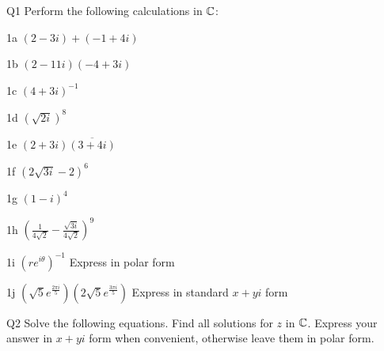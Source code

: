 \begin{question}{Q1}
Perform the following calculations in $\mathbb{C}$:
\end{question}

\begin{question}{1a}
$(2-3i)+(-1 +4i)$
\end{question}
\begin{question}{1b}
$(2-11i)(-4+3i)$
\end{question}
\begin{question}{1c}
$(4+3i)^{-1}$
\end{question}
\begin{question}{1d}
$(\sqrt{2i})^{8}$
\end{question}
\begin{question}{1e}
$(2+3i)\overline{(3+4i)}$
\end{question}
\begin{question}{1f}
$(2\sqrt{3i}-2)^{6}$
\end{question}
\begin{question}{1g}
$(1-i)^{4}$
\end{question}
\begin{question}{1h}
$(\frac{1}{4\sqrt{2}} - \frac{\sqrt{3i}}{4\sqrt{2}})^{9}$
\end{question}
\begin{question}{1i}
$(re^{i\theta})^{-1}$ Express in polar form
\end{question}
\begin{question}{1j}
$(\sqrt{5}e^{\frac{2\pi i}{5}})(2\sqrt{5}e^{\frac{3\pi i}{5}})$
Express in standard $x+yi$ form
\end{question}
\begin{question}{Q2}
Solve the following equations. Find all solutions for $z$ in $\mathbb{C}$. Express your answer in $x+yi$ form when convenient, otherwise leave them in polar form.
\end{question}

